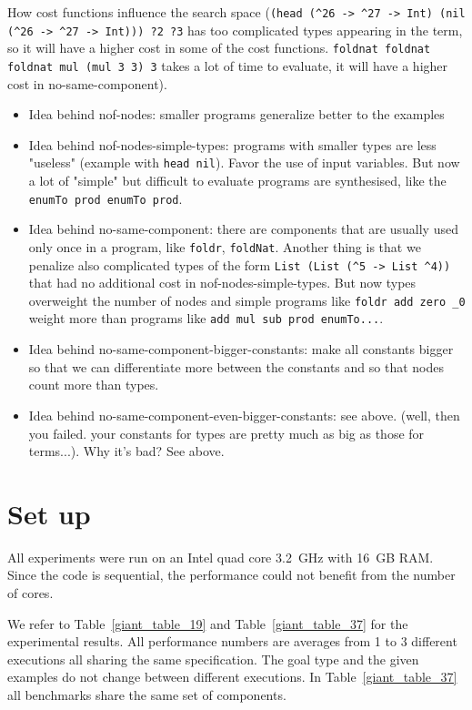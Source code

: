 \begin{itemize}
How cost functions influence the search space (\lstinline!(head (^26 -> ^27 -> Int) (nil (^26 -> ^27 -> Int))) ?2 ?3! has too complicated types appearing in the term, so it will have a higher cost in some of the cost functions. \lstinline!foldnat foldnat foldnat mul (mul 3 3) 3! takes a lot of time to evaluate, it will have a higher cost in no-same-component).
\begin{itemize}
\item Idea behind nof-nodes: smaller programs generalize better to the examples
\item Idea behind nof-nodes-simple-types: programs with smaller types are less "useless" (example with \lstinline?head nil?). Favor the use of input variables. But now a lot of "simple" but difficult to evaluate programs are synthesised, like the \lstinline?enumTo prod enumTo prod?.
\item Idea behind no-same-component: there are components that are usually used only once in a program, like \lstinline?foldr?, \lstinline?foldNat?. Another thing is that we penalize also complicated types of the form \lstinline?List (List (^5 -> List ^4))? that had no additional cost in nof-nodes-simple-types. But now types overweight the number of nodes and simple programs like \lstinline?foldr add zero _0? weight more than programs like \lstinline?add mul sub prod enumTo...?.
\item Idea behind no-same-component-bigger-constants: make all constants bigger so that we can differentiate more between the constants and so that nodes count more than types.
\item Idea behind no-same-component-even-bigger-constants: see above. (well, then you failed. your constants for types are pretty much as big as those for terms...). Why it's bad? See above.
\end{itemize}
\end{itemize}

\section{Set up}
All experiments were run on an Intel quad core 3.2~GHz with 16~GB RAM. Since the code is sequential, the performance could not benefit from the number of cores.

We refer to Table~\ref{giant_table_19} and Table~\ref{giant_table_37} for the experimental results. All performance numbers are averages from 1 to 3 different executions all sharing the same specification. The goal type and the given examples do not change between different executions. In Table~\ref{giant_table_37} all benchmarks share the same set of components.

